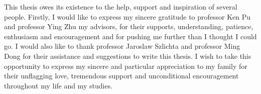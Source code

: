 This thesis owes its existence to the help, support and inspiration of several people. Firstly, I would like to express my sincere gratitude to professor Ken Pu and professor Ying Zhu my advisors, for their supports, understanding, patience, enthusiasm and encouragement and for pushing me further than I thought I could go. I would also like to thank professor Jaroslaw Szlichta and professor Ming Dong for their assistance and suggestions to write this thesis.
I wish to take this opportunity to express my sincere and particular appreciation to my family for their unflagging love, tremendous support and unconditional encouragement throughout my life and my studies. 